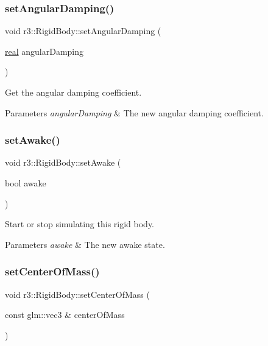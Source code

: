 \subsubsection{\texorpdfstring{set\+Angular\+Damping()}{setAngularDamping()}}
{\footnotesize\ttfamily void r3\+::\+Rigid\+Body\+::set\+Angular\+Damping (\begin{DoxyParamCaption}\item[{\mbox{\hyperlink{namespacer3_ab2016b3e3f743fb735afce242f0dc1eb}{real}}}]{angular\+Damping }\end{DoxyParamCaption})}



Get the angular damping coefficient. 


\begin{DoxyParams}{Parameters}
{\em angular\+Damping} & The new angular damping coefficient. \\
\hline
\end{DoxyParams}
\mbox{\label{classr3_1_1_rigid_body_acd934e55a7f2f09d91f62ded40ebb325}} 
\subsubsection{\texorpdfstring{set\+Awake()}{setAwake()}}
{\footnotesize\ttfamily void r3\+::\+Rigid\+Body\+::set\+Awake (\begin{DoxyParamCaption}\item[{bool}]{awake }\end{DoxyParamCaption})}



Start or stop simulating this rigid body. 


\begin{DoxyParams}{Parameters}
{\em awake} & The new awake state. \\
\hline
\end{DoxyParams}
\mbox{\label{classr3_1_1_rigid_body_a96d0738162ca1fe649bab7174e21afd8}} 
\subsubsection{\texorpdfstring{set\+Center\+Of\+Mass()}{setCenterOfMass()}\hspace{0.1cm}{\footnotesize\ttfamily [1/2]}}
{\footnotesize\ttfamily void r3\+::\+Rigid\+Body\+::set\+Center\+Of\+Mass (\begin{DoxyParamCaption}\item[{const glm\+::vec3 \&}]{center\+Of\+Mass }\end{DoxyParamCaption})}



